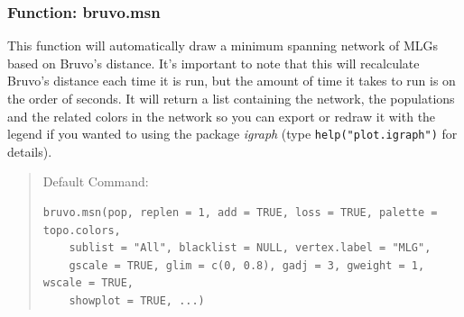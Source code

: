 \documentclass[letterpaper]{article}\usepackage[]{graphicx}\usepackage[]{color}
\makeatletter
\newenvironment{kframe}{%
 \def\at@end@of@kframe{}%
 \ifinner\ifhmode%
  \def\at@end@of@kframe{\end{minipage}}%
  \begin{minipage}{\columnwidth}%
 \fi\fi%
 \def\FrameCommand##1{\hskip\@totalleftmargin \hskip-\fboxsep
 \colorbox{shadecolor}{##1}\hskip-\fboxsep
     \hskip-\linewidth \hskip-\@totalleftmargin \hskip\columnwidth}%
 \MakeFramed {\advance\hsize-\width
   \@totalleftmargin\z@ \linewidth\hsize
   \@setminipage}}%
 {\par\unskip\endMakeFramed%
 \at@end@of@kframe}
\newenvironment{knitrout}{}{} %
\newcommand{\tab}{\hspace*{1em}}
\makeatother
\begin{document}
\subsubsection{Function: bruvo.msn}\label{index:trees:bruvo.msn}
\tab\tab This function will automatically draw a minimum spanning network of MLGs based on Bruvo's distance. It's important to note that this will recalculate Bruvo's distance each time it is run, but the amount of time it takes to run is on the order of seconds. It will return a list containing the network, the populations and the related colors in the network so you can export or redraw it with the legend if you wanted to using the package \textit{igraph} (type \texttt{help("plot.igraph")} for details).
\begin{quote}
Default Command:
\begin{knitrout}
\color{fgcolor}\begin{kframe}
\begin{verbatim}
bruvo.msn(pop, replen = 1, add = TRUE, loss = TRUE, palette = topo.colors, 
    sublist = "All", blacklist = NULL, vertex.label = "MLG", 
    gscale = TRUE, glim = c(0, 0.8), gadj = 3, gweight = 1, wscale = TRUE, 
    showplot = TRUE, ...)
\end{verbatim}
\end{kframe}
\end{knitrout}

\end{quote}
\end{document}
